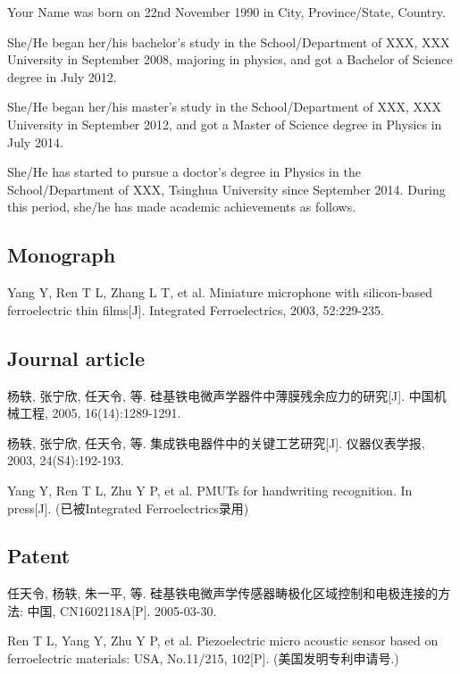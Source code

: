 
\begin{resume}

Your Name was born on 22nd November 1990 in City, Province/State, Country.

She/He began her/his bachelor’s study in the School/Department of XXX, XXX University in September 2008, majoring in physics, and got a Bachelor of Science degree in July 2012.

She/He began her/his master’s study in the School/Department of XXX, XXX University in September 2012, and got a Master of Science degree in Physics in July 2014.

She/He has started to pursue a doctor’s degree in Physics in the School/Department of XXX, Tsinghua University since September 2014. During this period, she/he has made academic achievements as follows.

  \subsection*{Monograph}
  \begin{achievements}
    \item Yang Y, Ren T L, Zhang L T, et al. Miniature microphone with silicon-based ferroelectric thin films[J]. Integrated Ferroelectrics, 2003, 52:229-235.
  \end{achievements}

  \subsection*{Journal article}
  \begin{achievements}
    \item 杨轶, 张宁欣, 任天令, 等. 硅基铁电微声学器件中薄膜残余应力的研究[J]. 中国机械工程, 2005, 16(14):1289-1291.
    \item 杨轶, 张宁欣, 任天令, 等. 集成铁电器件中的关键工艺研究[J]. 仪器仪表学报, 2003, 24(S4):192-193.
    \item Yang Y, Ren T L, Zhu Y P, et al. PMUTs for handwriting recognition. In press[J]. (已被Integrated Ferroelectrics录用)
  \end{achievements}


  \subsection*{Patent}
  \begin{achievements}
    \item 任天令, 杨轶, 朱一平, 等. 硅基铁电微声学传感器畴极化区域控制和电极连接的方法: 中国, CN1602118A[P]. 2005-03-30.
    \item Ren T L, Yang Y, Zhu Y P, et al. Piezoelectric micro acoustic sensor based on ferroelectric materials: USA, No.11/215, 102[P]. (美国发明专利申请号.)
  \end{achievements}

\end{resume}
